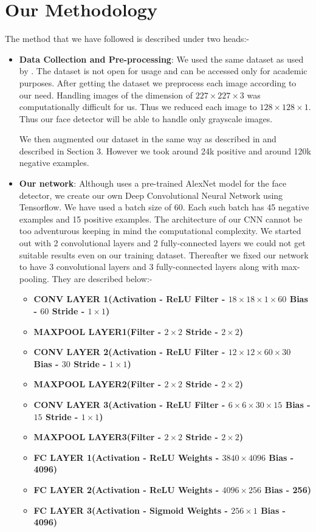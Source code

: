 \documentclass{article}
\begin{document}
\section{Our Methodology}
The method that we have followed is described under two heads:-
\begin{itemize}
\item \textbf{Data Collection and Pre-processing}: We used the same dataset as used by \cite{paper}. The dataset \cite{dataset} is not open for usage and can be accessed only for academic purposes. After getting the dataset we preprocess each image according to our need. Handling images of the dimension of $227\times227\times 3$ was computationally difficult for us. Thus we reduced each image to $128\times128\times1$. Thus our face detector will be able to handle only grayscale images.\par
We then augmented our dataset in the same way as described in \cite{paper} and described in Section 3. However we took around 24k positive and around 120k negative examples. 
\item \textbf{Our network}: Although \cite{paper} uses a pre-trained AlexNet model for the face detector, we create our own Deep Convolutional Neural Network using Tensorflow. We have used a batch size of 60. Each such  batch has 45 negative examples and 15 positive examples. The architecture of our CNN cannot be too adventurous keeping in mind the computational complexity. We started out with 2 convolutional layers and 2 fully-connected layers we could not get suitable results even on our training dataset. Thereafter we fixed our network to have 3 convolutional layers and 3 fully-connected layers along with max-pooling. They are described below:-
\begin{itemize}
\item \textbf{CONV LAYER 1(Activation - ReLU Filter - $18\times18\times1\times60$ Bias - $60$ Stride - $1\times1$)}
\item \textbf{MAXPOOL LAYER1(Filter - $2\times2$ Stride - $2\times2$)}
\item \textbf{CONV LAYER 2(Activation - ReLU Filter - $12\times12\times60\times30$ Bias - $30$ Stride - $1\times1$)}
\item \textbf{MAXPOOL LAYER2(Filter - $2\times2$ Stride - $2\times2$)}
\item \textbf{CONV LAYER 3(Activation - ReLU Filter - $6\times6\times30\times15$ Bias - $15$ Stride - $1\times1$)}
\item \textbf{MAXPOOL LAYER3(Filter - $2\times2$ Stride - $2\times2$)}
\item \textbf{FC LAYER 1(Activation - ReLU Weights - $3840\times4096$ Bias - 4096)}
\item \textbf{FC LAYER 2(Activation - ReLU Weights - $4096\times256$ Bias - 256)}
\item \textbf{FC LAYER 3(Activation - Sigmoid Weights - $256\times1$ Bias - 4096)}


\end{itemize}
\end{itemize}
\end{document}
